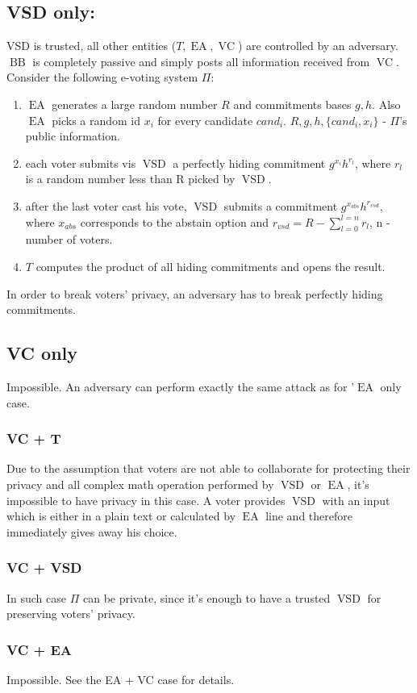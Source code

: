 \documentclass[12pt]{article}
\DeclareMathOperator{\vsd}{VSD}
\DeclareMathOperator{\ea}{EA}
\DeclareMathOperator{\bb}{BB}
\DeclareMathOperator{\voc}{VC}
\begin{document}
\subsection{VSD only:}
 VSD is trusted, all other entities ($T,\ea,\voc$) are controlled by an adversary. $\bb$ is completely passive and simply posts all information received from $\voc$. 
Consider the following e-voting system $\Pi$:
\begin{enumerate}
 \item $\ea$ generates a large random number $R$ and commitments bases $g,h$. Also $\ea$ picks a random id  $x_i$ for every candidate $cand_i$. $R,g,h, \{cand_i,x_i\}$  - $\Pi$'s public information. 
 \item each voter submits vis $\vsd$ a perfectly hiding commitment $g^{x_i}h^{r_l}$, where $r_l$ is a random number less than R picked by $\vsd$. 
 \item after the last voter cast his vote, $\vsd$ submits a commitment $g^{x_{abs}}h^{r_{vsd}}$, where $x_{abs}$ corresponds to the abstain option and $r_{vsd} = R - \sum_{l=0}^{l=n}r_l$, n - number of voters.  
 \item $T$ computes the product of all hiding commitments and opens the result.
 \end{enumerate}
  In order to break voters' privacy, an adversary has to break perfectly hiding commitments. 
\subsection{VC only}
  Impossible.   An adversary can perform exactly the same attack as for '$\ea$ only case.
\subsubsection{VC + T}
 Due to the assumption that voters are not able to collaborate for protecting their privacy and all complex math operation performed by $\vsd$ or $\ea$, it's impossible to have privacy in this case. A voter provides $\vsd$ with an input which is either in a plain text or calculated by $\ea$ line and therefore immediately gives away his choice.
\subsubsection{VC + VSD}
    In such case $\Pi$ can be private, since it's enough to have a trusted $\vsd$ for preserving voters' privacy. 
\subsubsection{VC + EA}
 Impossible. See the EA + VC  case for details. 
\end{document}
